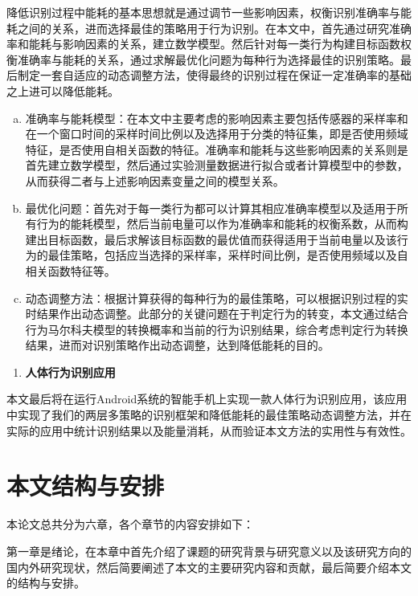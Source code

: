 \par 降低识别过程中能耗的基本思想就是通过调节一些影响因素，权衡识别准确率与能耗之间的关系，进而选择最佳的策略用于行为识别。在本文中，首先通过研究准确率和能耗与影响因素的关系，建立数学模型。然后针对每一类行为构建目标函数权衡准确率与能耗的关系，通过求解最优化问题为每种行为选择最佳的识别策略。最后制定一套自适应的动态调整方法，使得最终的识别过程在保证一定准确率的基础之上进可以降低能耗。
\begin{enumerate}[a)]
\item 准确率与能耗模型：在本文中主要考虑的影响因素主要包括传感器的采样率和在一个窗口时间的采样时间比例以及选择用于分类的特征集，即是否使用频域特征，是否使用自相关函数的特征。准确率和能耗与这些影响因素的关系则是首先建立数学模型，然后通过实验测量数据进行拟合或者计算模型中的参数，从而获得二者与上述影响因素变量之间的模型关系。
\item 最优化问题：首先对于每一类行为都可以计算其相应准确率模型以及适用于所有行为的能耗模型，然后当前电量可以作为准确率和能耗的权衡系数，从而构建出目标函数，最后求解该目标函数的最优值而获得适用于当前电量以及该行为的最佳策略，包括应当选择的采样率，采样时间比例，是否使用频域以及自相关函数特征等。
\item 动态调整方法：根据计算获得的每种行为的最佳策略，可以根据识别过程的实时结果作出动态调整。此部分的关键问题在于判定行为的转变，本文通过结合行为马尔科夫模型的转换概率和当前的行为识别结果，综合考虑判定行为转换结果，进而对识别策略作出动态调整，达到降低能耗的目的。
\end{enumerate}

\begin{enumerate}[(3)]
\item \textbf{人体行为识别应用
}
\end{enumerate}
\par 本文最后将在运行Android系统的智能手机上实现一款人体行为识别应用，该应用中实现了我们的两层多策略的识别框架和降低能耗的最佳策略动态调整方法，并在实际的应用中统计识别结果以及能量消耗，从而验证本文方法的实用性与有效性。

\section{本文结构与安排}
\par 本论文总共分为六章，各个章节的内容安排如下：
\par 第一章是绪论，在本章中首先介绍了课题的研究背景与研究意义以及该研究方向的国内外研究现状，然后简要阐述了本文的主要研究内容和贡献，最后简要介绍本文的结构与安排。

